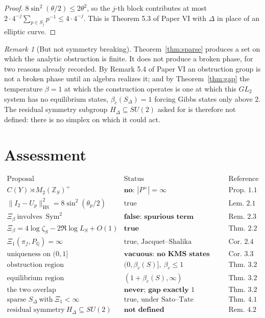 \documentclass[11pt]{amsart}
\numberwithin{equation}{section}
\theoremstyle{definition}
\theoremstyle{remark}
\newtheorem{remark}[theorem]{Remark}
\newcommand{\Z}{\mathbb{Z}}
\newcommand{\Q}{\mathbb{Q}}
\newcommand{\HS}{\mathrm{HS}}
\newcommand{\Sym}{\operatorname{Sym}}
\begin{document}
\begin{proof}
$8\sin^2(\theta/2)\le2\theta^2$, so the $j$-th block contributes at most
$2\cdot4^{-j}\sum_{p\in S_j}p^{-1}\le4\cdot4^{-j}$. This is Theorem 5.3 of Paper VI with
$\Delta$ in place of an elliptic curve.
\end{proof}

\begin{remark}[But not symmetry breaking]\label{rem:notbreaking}
Theorem~\ref{thm:sparse} produces a set on which the analytic obstruction is finite. It does
not produce a broken phase, for two reasons already recorded. By
Remark 5.4 of Paper VI an obstruction group is not a broken phase until an algebra realizes
it; and by Theorem~\ref{thm:gap} the temperature $\beta=1$ at which the construction operates
is one at which this $GL_2$ system has no equilibrium states, $\beta_c(S_\Delta)=1$ forcing
Gibbs states only above $2$. The residual symmetry subgroup $H_\Delta\subseteq SU(2)$ asked
for is therefore not defined: there is no simplex on which it could act.
\end{remark}

\section{Assessment}

\[
\begin{array}{lll}
\text{Proposal} & \text{Status} & \text{Reference}\\\hline
C(Y)\rtimes M_2(\Z_S)^+ & \textbf{no: }|P^\times|=\infty & \text{Prop.~1.1}\\
\|I_2-U_p\|^2_\HS=8\sin^2(\theta_p/2) & \text{true} & \text{Lem.~2.1}\\
\Xi_\beta\ \text{involves}\ \Sym^2 & \textbf{false: spurious term} & \text{Rem.~2.3}\\
\Xi_\beta=4\log\zeta_S-2\Re\log L_S+O(1) & \textbf{true} & \text{Thm.~2.2}\\
\Xi_1(\pi_f,P_\Q)=\infty & \text{true, Jacquet--Shalika} & \text{Cor.~2.4}\\
\text{uniqueness on }(0,1] & \textbf{vacuous: no KMS states there} & \text{Cor.~3.3}\\
\text{obstruction region} & (0,\beta_c(S)],\ \beta_c\le1 & \text{Thm.~3.2}\\
\text{equilibrium region} & (1+\beta_c(S),\infty) & \text{Thm.~3.2}\\
\text{the two overlap} & \textbf{never; gap exactly }1 & \text{Thm.~3.2}\\
\text{sparse }S_\Delta\ \text{with}\ \Xi_1<\infty & \text{true, under Sato--Tate} & \text{Thm.~4.1}\\
\text{residual symmetry}\ H_\Delta\subseteq SU(2) & \textbf{not defined} & \text{Rem.~4.2}
\end{array}
\]
\end{document}

